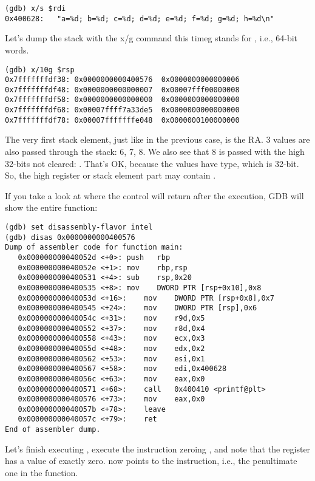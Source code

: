 \begin{lstlisting}[caption=let's inspect the format string]
(gdb) x/s $rdi
0x400628:	"a=%d; b=%d; c=%d; d=%d; e=%d; f=%d; g=%d; h=%d\n"
\end{lstlisting}

Let's dump the stack with the x/g command this time\EMDASH{}g stands for , i.e., 64-bit words.

\begin{lstlisting}
(gdb) x/10g $rsp
0x7fffffffdf38:	0x0000000000400576	0x0000000000000006
0x7fffffffdf48:	0x0000000000000007	0x00007fff00000008
0x7fffffffdf58:	0x0000000000000000	0x0000000000000000
0x7fffffffdf68:	0x00007ffff7a33de5	0x0000000000000000
0x7fffffffdf78:	0x00007fffffffe048	0x0000000100000000
\end{lstlisting}

The very first stack element, just like in the previous case, is the \ac{RA}.
3 values are also passed through the stack: 6, 7, 8.
We also see that 8 is passed with the high 32-bits not cleared: .
That's OK, because the values have \Tint type, which is 32-bit.
So, the high register or stack element part may contain .

If you take a look at where the control will return after the \printf execution,
\ac{GDB} will show the entire \main function:

\begin{lstlisting}
(gdb) set disassembly-flavor intel
(gdb) disas 0x0000000000400576
Dump of assembler code for function main:
   0x000000000040052d <+0>:	push   rbp
   0x000000000040052e <+1>:	mov    rbp,rsp
   0x0000000000400531 <+4>:	sub    rsp,0x20
   0x0000000000400535 <+8>:	mov    DWORD PTR [rsp+0x10],0x8
   0x000000000040053d <+16>:	mov    DWORD PTR [rsp+0x8],0x7
   0x0000000000400545 <+24>:	mov    DWORD PTR [rsp],0x6
   0x000000000040054c <+31>:	mov    r9d,0x5
   0x0000000000400552 <+37>:	mov    r8d,0x4
   0x0000000000400558 <+43>:	mov    ecx,0x3
   0x000000000040055d <+48>:	mov    edx,0x2
   0x0000000000400562 <+53>:	mov    esi,0x1
   0x0000000000400567 <+58>:	mov    edi,0x400628
   0x000000000040056c <+63>:	mov    eax,0x0
   0x0000000000400571 <+68>:	call   0x400410 <printf@plt>
   0x0000000000400576 <+73>:	mov    eax,0x0
   0x000000000040057b <+78>:	leave  
   0x000000000040057c <+79>:	ret    
End of assembler dump.
\end{lstlisting}

Let's finish executing \printf, execute the instruction
zeroing \EAX, and note that the \EAX register has a value of exactly zero.
\RIP now points to the  instruction, i.e., the penultimate one in the \main function.

